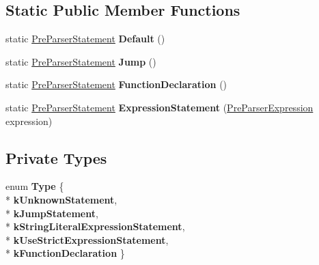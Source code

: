 \subsection*{Static Public Member Functions}
\begin{DoxyCompactItemize}
\item 
static \hyperlink{classv8_1_1internal_1_1_pre_parser_statement}{Pre\+Parser\+Statement} {\bfseries Default} ()\hypertarget{classv8_1_1internal_1_1_pre_parser_statement_a932e6f366056841f205219195c215da3}{}\label{classv8_1_1internal_1_1_pre_parser_statement_a932e6f366056841f205219195c215da3}

\item 
static \hyperlink{classv8_1_1internal_1_1_pre_parser_statement}{Pre\+Parser\+Statement} {\bfseries Jump} ()\hypertarget{classv8_1_1internal_1_1_pre_parser_statement_aaa6ea3a564b5d61801de03d78059e0b4}{}\label{classv8_1_1internal_1_1_pre_parser_statement_aaa6ea3a564b5d61801de03d78059e0b4}

\item 
static \hyperlink{classv8_1_1internal_1_1_pre_parser_statement}{Pre\+Parser\+Statement} {\bfseries Function\+Declaration} ()\hypertarget{classv8_1_1internal_1_1_pre_parser_statement_a5c6f48c997864cabdd64cf09d067b8eb}{}\label{classv8_1_1internal_1_1_pre_parser_statement_a5c6f48c997864cabdd64cf09d067b8eb}

\item 
static \hyperlink{classv8_1_1internal_1_1_pre_parser_statement}{Pre\+Parser\+Statement} {\bfseries Expression\+Statement} (\hyperlink{classv8_1_1internal_1_1_pre_parser_expression}{Pre\+Parser\+Expression} expression)\hypertarget{classv8_1_1internal_1_1_pre_parser_statement_aa36e1a3ac10bac08b27767bae6bb44e9}{}\label{classv8_1_1internal_1_1_pre_parser_statement_aa36e1a3ac10bac08b27767bae6bb44e9}

\end{DoxyCompactItemize}
\subsection*{Private Types}
\begin{DoxyCompactItemize}
\item 
enum {\bfseries Type} \{ \\*
{\bfseries k\+Unknown\+Statement}, 
\\*
{\bfseries k\+Jump\+Statement}, 
\\*
{\bfseries k\+String\+Literal\+Expression\+Statement}, 
\\*
{\bfseries k\+Use\+Strict\+Expression\+Statement}, 
\\*
{\bfseries k\+Function\+Declaration}
 \}\hypertarget{classv8_1_1internal_1_1_pre_parser_statement_a524a5c7c9a6c4a9c54118e81ccffc980}{}\label{classv8_1_1internal_1_1_pre_parser_statement_a524a5c7c9a6c4a9c54118e81ccffc980}

\end{DoxyCompactItemize}

